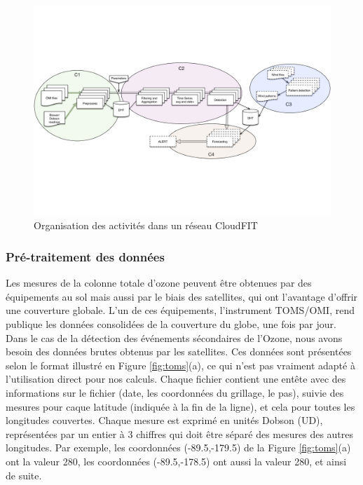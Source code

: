 \begin{figure}
	\centering
	\includegraphics[width=1\linewidth]{img/4-process}
	\caption{Organisation des activités dans un réseau CloudFIT}\label{fig:blocs}
\end{figure}

\subsubsection{Pré-traitement des données}

Les mesures de la colonne totale d'ozone peuvent être obtenues par des équipements au sol mais aussi par le biais des satellites, qui ont l'avantage d'offrir une couverture globale. L'un de ces équipements, l'instrument TOMS/OMI, rend publique les données consolidées de la couverture du globe, une fois par jour. Dans le cas de la détection des événements sécondaires de l'Ozone, nous avons besoin des données brutes obtenus par les satellites. Ces données sont présentées selon le format illustré en Figure \ref{fig:toms}(a), ce qui n'est pas vraiment adapté à l'utilisation direct pour nos calculs. Chaque fichier contient une entête avec des informations sur le fichier (date, les coordonnées du grillage, le pas), suivie des mesures pour caque latitude (indiquée à la fin de la ligne), et cela pour toutes les longitudes couvertes. Chaque mesure est exprimé en unités Dobson (UD), représentées par un entier à 3 chiffres qui doit être séparé des mesures des autres longitudes. Par exemple, les coordonnées (-89.5,-179.5) de la Figure \ref{fig:toms}(a) ont la valeur 280, les coordonnées (-89.5,-178.5) ont aussi la valeur 280, et ainsi de suite.   

